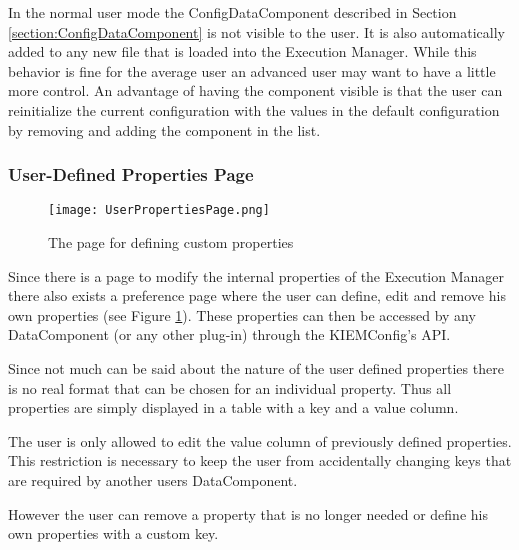 In the normal user mode the ConfigDataComponent described in Section \ref{section:ConfigDataComponent} is
not visible to the user. It is also automatically added to any new file that is loaded into the Execution Manager.
While this behavior is fine for the average user an advanced user may want to have a little more control. An advantage
of having the component visible is that the user can reinitialize the current configuration with the values in
the default configuration by removing and adding the component in the list.


\subsubsection{User-Defined Properties Page}
\label{section:UserDefinedPropertiesPage}
\begin{figure}[User-Defined Properties Page]
  \centering
  \texttt{[image: UserPropertiesPage.png]}
  \caption[The page for defining custom properties]%
  {The page for defining custom properties\protect}
  \label{fig:UserDefinedPropertiesPage}
\end{figure}
Since there is a page to modify the internal properties of the Execution Manager there also exists a
preference page where the user can define, edit and remove his own properties (see Figure \ref{fig:UserDefinedPropertiesPage}). 
These properties can then be accessed by any DataComponent (or any other plug-in) through the \ac{KIEMConfig}'s \ac{API}.

Since not much can be said about the nature of the user defined properties there is no real format that
can be chosen for an individual property. Thus all properties are simply displayed in a table with a 
key and a value column. 

The user is only allowed to edit the value column of previously defined properties. This restriction is
necessary to keep the user from accidentally changing keys that are required by another users DataComponent.

However the user can remove a property that is no longer needed or define his own properties with a custom key.

